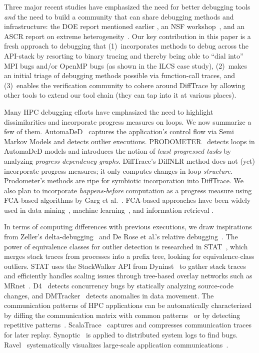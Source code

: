 Three major recent studies
have emphasized the need for better debugging tools
{\em and} the need to build a community that can share debugging
methods and infrastructure: the DOE report mentioned
earlier \cite{hpcdoe},
an NSF workshop~\cite{Cohen:2018:IRC:3297279}, and an ASCR report on
extreme heterogeneity~\cite{ascr-report-extreme-heterogeneity}.
%
Our key contribution in this paper is a fresh approach to debugging
that (1)~incorporates methods to debug across the API-stack
by resorting to binary tracing and thereby being able to ``dial into''
MPI bugs and/or OpenMP bugs (as shown in the ILCS case study), (2)~makes
an initial triage of debugging methods possible via function-call traces,
and (3)~enables the verification community to cohere around DiffTrace
by allowing other tools to extend our tool chain (they can tap into it at various places).


Many HPC debugging efforts have emphasized
the need to highlight dissimilarities and
incorporate progress measures on loops. We now
summarize a few of them.
%
AutomaDeD~\cite{automaded-GBron}\cite{automaded-laguna}
captures the application's control flow
via Semi Markov Models and detects outlier executions.
%
PRODOMETER~\cite{prodometer} detects loops in
AutomaDeD models and introduces the
notion of {\em least progressed tasks} by analyzing {\em progress dependency graphs}.
%
DiffTrace's DiffNLR method does not (yet) incorporate progress measures; it only
computes changes in loop {\em structure}.
%
Prodometer's methods are ripe for symbiotic incorporation into DiffTrace.
%
We also plan to incorporate {\em happens-before} computation as a progress measure using FCA-based algorithms by Garg et al.~\cite{latticeForDistConst,garg_2015}.
%
FCA-based approaches have been widely used in data mining~\cite{cldm},
machine learning~\cite{clml}, and information retrieval \cite{ignatov17}.


In terms of computing differences with previous executions,
we draw inspirations from
Zeller's delta-debugging~\cite{DBLP:conf/esec/Zeller99}
and De Rose et al.'s relative debugging~\cite{relative-debugging}.
%
The power of equivalence classes for outlier detection is
researched in STAT~\cite{stat}, which
merges stack traces from processes into a prefix tree,
looking for equivalence-class outliers.
%
STAT uses the StackWalker API from Dyninst~\cite{dyninst} to gather stack traces
and efficiently handles scaling issues
through tree-based overlay networks such as MRnet~\cite{mrnet}.
%
D4~\cite{liu-18} detects concurrency bugs by statically analyzing source-code
changes, and DMTracker~\cite{dmtracker} detects anomalies in data movement.
%
The communication patterns of HPC applications can be automatically characterized by
diffing the communication matrix with common patterns~\cite{roth-15} or by
detecting repetitive patterns~\cite{preissl-08}.
%
ScalaTrace~\cite{scalatrace} captures and compresses communication traces for later replay. 
%
Synoptic~\cite{beschastnikh-synoptic} is applied to distributed
system logs to find bugs.
%
Ravel~\cite{ravel} systematically visualizes
large-scale application communications~\cite{charmVis}. 

